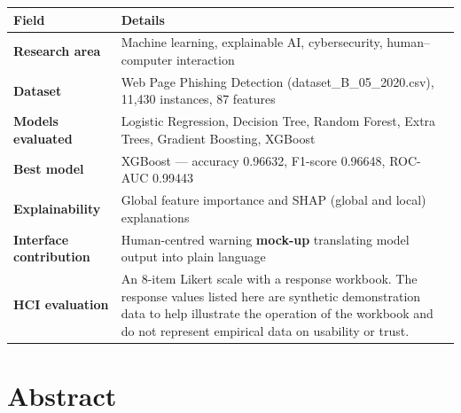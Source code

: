\documentclass[11pt,a4paper]{article}
\renewcommand{\arraystretch}{1.25}
\begin{document}
\renewcommand{\arraystretch}{1.3}
\begin{tabularx}{\textwidth}{>{\bfseries}p{3.6cm} L}
\toprule
Field & Details \\
\midrule
Research area & Machine learning, explainable AI, cybersecurity, human--computer interaction \\
Dataset & Web Page Phishing Detection (dataset\_B\_05\_2020.csv), 11{,}430 instances, 87 features \\
Models evaluated & Logistic Regression, Decision Tree, Random Forest, Extra Trees, Gradient Boosting, XGBoost \\
Best model & XGBoost --- accuracy 0.96632, F1-score 0.96648, ROC-AUC 0.99443 \\
Explainability & Global feature importance and SHAP (global and local) explanations \\
Interface contribution & Human-centred warning \textbf{mock-up} translating model output into plain language \\
HCI evaluation & An 8-item Likert scale with a response workbook. The response values listed here are synthetic demonstration data to help illustrate the operation of the workbook and do not represent empirical data on usability or trust. \\
\bottomrule
\end{tabularx}

\section*{Abstract}
\end{document}
